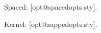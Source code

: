\documentclass{article}
\makeatletter
\edef\spacedlist{\csname opt@spacedopts.sty\endcsname}
\edef\kernellist{\csname opt@zappedopts.sty\endcsname}
\makeatother
\begin{document}
Spaced: [\spacedlist].

Kernel: [\kernellist].
\end{document}
